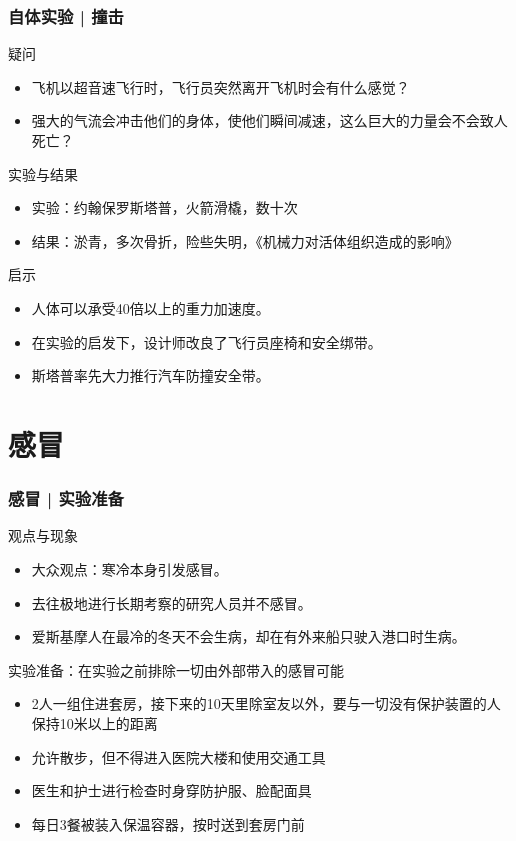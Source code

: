 \begin{frame}
  \frametitle{自体实验 | 撞击}
  \begin{block}{疑问}
    \begin{itemize}
      \item 飞机以超音速飞行时，飞行员突然离开飞机时会有什么感觉？
      \item 强大的气流会冲击他们的身体，使他们瞬间减速，这么巨大的力量会不会致人死亡？
    \end{itemize}
  \end{block}
  \pause
  \begin{block}{实验与结果}
    \begin{itemize}
      \item 实验：约翰\textbullet 保罗\textbullet 斯塔普，火箭滑橇，数十次
      \item 结果：淤青，多次骨折，险些失明，《机械力对活体组织造成的影响》
    \end{itemize}
  \end{block}
  \pause
  \begin{block}{启示}
    \begin{itemize}
      \item 人体可以承受40倍以上的重力加速度。
      \item 在实验的启发下，设计师改良了飞行员座椅和安全绑带。
      \item 斯塔普率先大力推行汽车防撞安全带。
    \end{itemize}
  \end{block}
\end{frame}

\section{感冒}
\begin{frame}
  \frametitle{感冒 | 实验准备}
  \begin{block}{观点与现象}
    \begin{itemize}
      \item 大众观点：寒冷本身引发感冒。
      \item 去往极地进行长期考察的研究人员并不感冒。
      \item 爱斯基摩人在最冷的冬天不会生病，却在有外来船只驶入港口时生病。
    \end{itemize}
  \end{block}
  \pause
  \begin{block}{实验准备：在实验之前排除一切由外部带入的感冒可能}
    \begin{itemize}
      \item 2人一组住进套房，接下来的10天里除室友以外，要与一切没有保护装置的人保持10米以上的距离
      \item 允许散步，但不得进入医院大楼和使用交通工具
      \item 医生和护士进行检查时身穿防护服、脸配面具
      \item 每日3餐被装入保温容器，按时送到套房门前
    \end{itemize}
  \end{block}
\end{frame}

